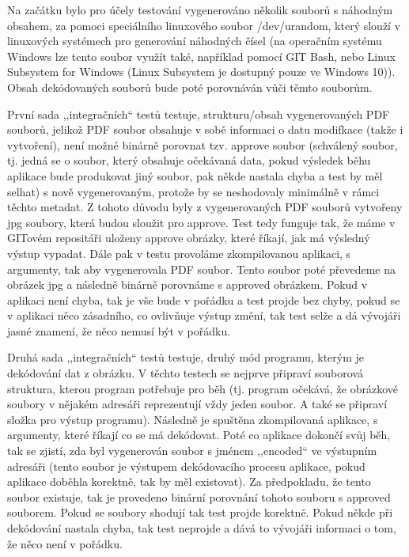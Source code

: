 \documentclass[conference]{IEEEtran}
\begin{document}
Na začátku bylo pro účely testování vygenerováno několik souborů s náhodným obsahem, za pomoci speciálního linuxového soubor /dev/urandom, který slouží v linuxových systémech pro generování náhodných čísel (na operačním systému Windows lze tento soubor využít také, například pomocí GIT Bash, nebo Linux Subsystem for Windows (Linux Subsystem je dostupný pouze ve Windows 10)). Obsah dekódovaných souborů bude poté porovnáván vůči těmto souborům.

První sada ,,integračních`` testů testuje, strukturu/obsah vygenerovaných PDF souborů, jelikož PDF soubor obsahuje v sobě informaci o datu modifkace (takže i vytvoření), není možné binárně porovnat tzv. approve soubor (schválený soubor, tj. jedná se o soubor, který obsahuje očekávaná data, pokud výsledek běhu aplikace bude produkovat jiný soubor, pak někde nastala chyba a test by měl selhat) s nově vygenerovaným, protože by se neshodovaly minimálně v rámci těchto metadat. Z tohoto důvodu byly z vygenerovaných PDF souborů vytvořeny jpg soubory, která budou sloužit pro approve. Test tedy funguje tak, že máme v GITovém repositáři uloženy approve obrázky, které říkají, jak má výsledný výstup vypadat. Dále pak v testu provoláme zkompilovanou aplikaci, s argumenty, tak aby vygenerovala PDF soubor. Tento soubor poté převedeme na obrázek jpg a následně binárně porovnáme s approved obrázkem. Pokud v aplikaci není chyba, tak je vše bude v pořádku a test projde bez chyby, pokud se v aplikaci něco zásadního, co ovlivňuje výstup změní, tak test selže a dá vývojáři jasné znamení, že něco nemusí být v pořádku.

Druhá sada ,,integračních`` testů testuje, druhý mód programu, kterým je dekódování dat z obrázku. V těchto testech se nejprve připraví souborová struktura, kterou program potřebuje pro běh (tj. program očekává, že obrázkové soubory v nějakém adresáři reprezentují vždy jeden soubor. A také se připraví složka pro výstup programu). Následně je spuštěna zkompilovaná aplikace, s argumenty, které říkají co se má dekódovat. Poté co aplikace dokončí svůj běh, tak se zjistí, zda byl vygenerován soubor s jménem ,,encoded`` ve výstupním adresáři (tento soubor je výstupem dekódovacího procesu aplikace, pokud aplikace doběhla korektně, tak by měl existovat). Za předpokladu, že tento soubor existuje, tak je provedeno binární porovnání tohoto souboru s approved souborem. Pokud se soubory shodují tak test projde korektně. Pokud někde při dekódování nastala chyba, tak test neprojde a dává to vývojáři informaci o tom, že něco není v pořádku.
\end{document}

